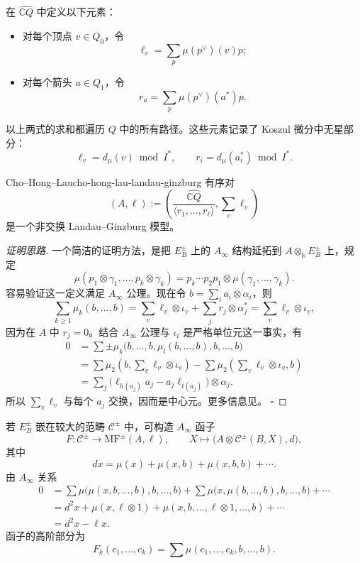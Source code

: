 在 $\widehat{\mathbb C Q}$ 中定义以下元素：
\begin{itemize}
  \item 对每个顶点 $v\in Q_0$，令
  \[
    \ell_v=\sum_p\mu(p^\vee)(v)p;
  \]
  \item 对每个箭头 $a\in Q_1$，令
  \[
    r_a=\sum_p\mu(p^\vee)(a^*)p.
  \]
\end{itemize}
以上两式的求和都遍历 $Q$ 中的所有路径。这些元素记录了 Koszul 微分中无星部分：
\[
  \ell_v=d_\mu(v)\bmod I^*,\qquad r_i=d_\mu(a_i^*)\bmod I^*.
\]

\begin{theorem}{Cho--Hong--Lau}{cho-hong-lau-landau-ginzburg}
有序对
\[
  (A,\ell):=
  \left(\frac{\widehat{\mathbb C Q}}{\langle r_1,\ldots,r_\ell\rangle},
  \sum_v\ell_v\right)
\]
是一个非交换 Landau--Ginzburg 模型。
\end{theorem}
\begin{proof}[证明思路]
一个简洁的证明方法，是把 $E_B^{\pm}$ 上的 $A_\infty$ 结构延拓到 $A\otimes_{\Bbbk}E_B^{\pm}$ 上，规定
\[
  \mu(p_1\otimes\gamma_1,\ldots,p_k\otimes\gamma_k)
  =p_k\cdots p_2p_1\otimes\mu(\gamma_1,\ldots,\gamma_k).
\]
容易验证这一定义满足 $A_\infty$ 公理。现在令 $b=\sum_i a_i\otimes\alpha_i$，则
\[
  \sum_{k\geq1}\mu_k(b,\ldots,b)
  =\sum_v\ell_v\otimes\iota_v+\sum_jr_j\otimes\alpha_j^*
  =\sum_v\ell_v\otimes\iota_v,
\]
因为在 $A$ 中 $r_j=0$。结合 $A_\infty$ 公理与 $\iota_i$ 是严格单位元这一事实，有
\begin{align*}
  0&=\sum\pm\mu_k\bigl(b,\ldots,b,\mu_l(b,\ldots,b),b,\ldots,b\bigr)\\
   &=\sum\mu_2\left(b,\sum_v\ell_v\otimes\iota_v\right)
     -\sum\mu_2\left(\sum_v\ell_v\otimes\iota_v,b\right)\\
   &=\sum_j\bigl(\ell_{h(a_j)}a_j-a_j\ell_{t(a_j)}\bigr)\otimes\alpha_j.
\end{align*}
所以 $\sum_v\ell_v$ 与每个 $a_j$ 交换，因而是中心元。更多信息见。
\hfill$\square$
\end{proof}

若 $E_B^{\pm}$ 嵌在较大的范畴 $\mathcal C^{\pm}$ 中，可构造 $A_\infty$ 函子
\[
  F:\mathcal C^{\pm}\longrightarrow\mathrm{MF}^{\pm}(A,\ell),\qquad
  X\longmapsto\bigl(A\otimes\mathcal C^{\pm}(B,X),d\bigr),
\]
其中
\[
  dx=\mu(x)+\mu(x,b)+\mu(x,b,b)+\cdots.
\]
由 $A_\infty$ 关系
\[
\begin{aligned}
  0&=\sum\mu\bigl(\mu(x,b,\ldots,b),b,\ldots,b\bigr)
  +\sum\mu\bigl(x,\mu(b,\ldots,b),b,\ldots,b\bigr)+\cdots\\
   &=d^2x+\mu(x,\ell\otimes1)+\mu(x,b,\ldots,\ell\otimes1,\ldots,b)+\cdots\\
   &=d^2x-\ell x.
\end{aligned}
\]
函子的高阶部分为
\[
  F_k(c_1,\ldots,c_k)=\sum\mu(c_1,\ldots,c_k,b,\ldots,b).
\]

